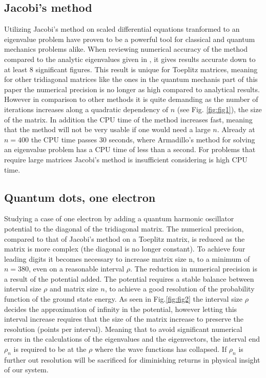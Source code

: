 \documentclass{emulateapj}
\begin{document}
\subsection{Jacobi's method}
Utilizing Jacobi's method on scaled differential equations tranformed to an eigenvalue problem have proven to be a powerful tool for classical and quantum mechanics problems alike. When reviewing numerical accuracy of the method  compared to the analytic eigenvalues given in \cite{2}, it gives results accurate down to at least 8 significant figures. This result is unique for Toeplitz matrices, meaning for other tridiagonal matrices like the ones in the quantum mechanis part of this paper the numerical precision is no longer as high compared to analytical results. However in comparison to other methods it is quite demanding as the number of iterations increases along a quadratic dependency of $n$ (see Fig. \ref{fig:fig1}), the size of the matrix. In addition the CPU time of the method increases fast, meaning that the method will not be very usable if one would need a large $n$. Already at $n = 400$ the CPU time passes $30$ seconds, where Armadillo's method for solving an eigenvalue problem has a CPU time of less than a second. For problems that require large matrices Jacobi's method is insufficient considering is high CPU time.
%
\subsection{Quantum dots, one electron}
Studying a case of one electron by adding a quantum harmonic oscillator potential to the diagonal of the tridiagonal matrix. The numerical precision, compared to that of Jacobi's method on a Toeplitz matrix, is reduced as the matrix is more complex (the diagonal is no longer constant). To achieve four leading digits it becomes necessary to increase matrix size n, to a minimum of $n = 380$, even on a reasonable interval $\rho$. The reduction in numerical precision is a result of the potential added. The potential requires a stable balance between interval size $\rho$ and matrix size $n$, to achieve a good resolution of the probability function of the ground state energy. As seen in Fig.\ref{fig:fig2} the interval size $\rho$ decides the approximation of infinity in the potential, however letting this interval increase requires that the size of the matrix increase to preserve the resolution (points per interval). Meaning that to avoid significant numerical errors in the calculations of the eigenvalues and the eigenvectors, the interval end $\rho_{n}$ is required to be at the $\rho$ where the wave functions has collapsed. If $\rho_{n}$ is further out resolution will be sacrificed for diminishing returns in physical insight of our system.
%
\end{document}
